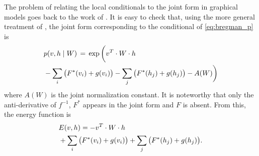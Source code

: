 \documentclass[twoside]{article}
\theoremstyle{plain}
\theoremstyle{definition}
\theoremstyle{remark}
\newcommand{\refEq}[1]{\cref{#1}}%
\newcommand{\boldit}[1]{\ensuremath{#1}}
\newcommand{\sfit}[1]{\ensuremath{#1}}
\newcommand{\xx}[0]{\ensuremath{\boldit{v}}}%
\newcommand{\x}[0]{\ensuremath{{v}}}%
\newcommand{\yy}[0]{\ensuremath{\boldit{h}}}%
\newcommand{\y}[0]{\ensuremath{{h}}}%
\newcommand{\WW}[0]{\ensuremath{\boldit{W}}}%
\newcommand{\pp}[0]{\ensuremath{\sfit{p}}}%
\newcommand{\ffinv}[0]{\ensuremath{\sfit{f}^{-1}}}%
\newcommand{\FF}[0]{\ensuremath{\sfit{F}}}%
\newcommand{\ZZ}[0]{\ensuremath{\sfit{A}}}%
\newcommand{\gh}[0]{\ensuremath{\sfit{g}}}%
\newcommand{\energy}[0]{\ensuremath{E}}%
\begin{document}
The problem of relating the local conditionals to the joint form in graphical models goes back to the work of \citet{besag1974spatial}.%
It is easy to check that, using the more general treatment of \citet{yang2012graphical}, 
the joint form corresponding to the conditional of \refEq{eq:bregman_p} is 
\begin{align}
  \label{eq:joint}
  &\pp(\xx, \yy \mid \WW) \, = \, \exp \bigg ( \xx^T \cdot \WW \cdot \yy  \\
 &- \sum_{i} \big(\FF^*(\x_i) + \gh(\x_i)\big) 
 - \sum_{j} \big(\FF^*(\y_j) + \gh(\y_j) \big) - \ZZ(\WW) \bigg ) \notag
\end{align}
where $\ZZ(\WW)$ is the joint normalization constant. It is noteworthy that only the anti-derivative of $\ffinv$, $\FF^*$ appears in the joint form and $\FF$ is absent.  
From this, the energy function is
\begin{align}\label{eq:energy}
   &\energy(\xx, \yy) = 
  - \xx^T \cdot \WW \cdot \yy  \\
 &+ \sum_{i} \big(\FF^*(\x_i) + \gh(\x_i)\big) + \sum_{j} \big(\FF^*(\y_j) + \gh(\y_j) \big).  \notag
 \end{align}
\end{document}
